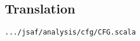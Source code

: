 \newcommand{\FunctionId}{\TT{FunctionId}}
\newcommand{\ArgVars}{\TT{ArgVars}}
\newcommand{\LocalVars}{\TT{LocalVars}}
\newcommand{\argVars}{\emph{argVars}}
\newcommand{\localVars}{\emph{localVars}}
\newcommand{\Node}{\TT{Node}}
\newcommand{\BlockNode}{\TT{BlockNode}}
\newcommand{\Nodelist}{\TT{Node list}}
\newcommand{\Nodeset}{\TT{Node set}}
\newcommand{\Unit}{\TT{Unit}}
\newcommand{\ControlPoint}{\TT{ControlPoint}}
\newcommand{\Label}{\TT{Label}}
\newcommand{\LEntry}{\SF{LEntry}}
\newcommand{\LExit}{\SF{LExit}}
\newcommand{\LExitExc}{\SF{LExitExc}}
\newcommand{\CFG}{\SF{CFG}}
\newcommand{\Length}{\emph{Length}}
\newcommand{\TailOf}{\emph{TailOf}}
\newcommand{\HeadOf}{\emph{HeadOf}}
\newcommand{\Fold}{\emph{Fold}}
\newcommand{\Iter}{\emph{Iter}}
\newcommand{\GetTail}{\emph{GetTail}}
\newcommand{\ToString}{\emph{ToString}}
\newcommand{\nullK}{{\inred\emph{null}}}


\subsection{Translation}
{\inblue\tt .../jsaf/analysis/cfg/CFG.scala}
